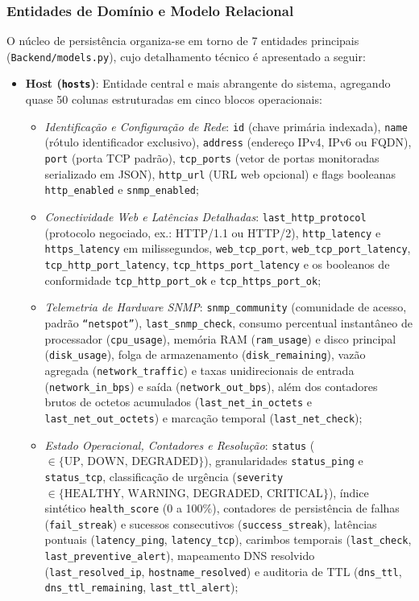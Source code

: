\documentclass[12pt,a4paper]{article}
\begin{document}
\subsubsection{Entidades de Domínio e Modelo Relacional}
O núcleo de persistência organiza-se em torno de 7 entidades principais (\texttt{Backend/models.py}), cujo detalhamento técnico é apresentado a seguir:

\begin{itemize}[leftmargin=1.25cm]
\item \textbf{Host (\texttt{hosts})}: Entidade central e mais abrangente do sistema, agregando quase 50 colunas estruturadas em cinco blocos operacionais:
  \begin{itemize}
  \item \textit{Identificação e Configuração de Rede}: \texttt{id} (chave primária indexada), \texttt{name} (rótulo identificador exclusivo), \texttt{address} (endereço IPv4, IPv6 ou FQDN), \texttt{port} (porta TCP padrão), \texttt{tcp\_ports} (vetor de portas monitoradas serializado em JSON), \texttt{http\_url} (URL web opcional) e flags booleanas \texttt{http\_enabled} e \texttt{snmp\_enabled};
  \item \textit{Conectividade Web e Latências Detalhadas}: \texttt{last\_http\_protocol} (protocolo negociado, ex.: HTTP/1.1 ou HTTP/2), \texttt{http\_latency} e \texttt{https\_latency} em milissegundos, \texttt{web\_tcp\_port}, \texttt{web\_tcp\_port\_latency}, \texttt{tcp\_http\_port\_latency}, \texttt{tcp\_https\_port\_latency} e os booleanos de conformidade \texttt{tcp\_http\_port\_ok} e \texttt{tcp\_https\_port\_ok};
  \item \textit{Telemetria de Hardware SNMP}: \texttt{snmp\_community} (comunidade de acesso, padrão \texttt{``netspot''}), \texttt{last\_snmp\_check}, consumo percentual instantâneo de processador (\texttt{cpu\_usage}), memória RAM (\texttt{ram\_usage}) e disco principal (\texttt{disk\_usage}), folga de armazenamento (\texttt{disk\_remaining}), vazão agregada (\texttt{network\_traffic}) e taxas unidirecionais de entrada (\texttt{network\_in\_bps}) e saída (\texttt{network\_out\_bps}), além dos contadores brutos de octetos acumulados (\texttt{last\_net\_in\_octets} e \texttt{last\_net\_out\_octets}) e marcação temporal (\texttt{last\_net\_check});
  \item \textit{Estado Operacional, Contadores e Resolução}: \texttt{status} ($\in \{\text{UP, DOWN, DEGRADED}\}$), granularidades \texttt{status\_ping} e \texttt{status\_tcp}, classificação de urgência (\texttt{severity} $\in \{\text{HEALTHY, WARNING, DEGRADED, CRITICAL}\}$), índice sintético \texttt{health\_score} (0 a 100\%), contadores de persistência de falhas (\texttt{fail\_streak}) e sucessos consecutivos (\texttt{success\_streak}), latências pontuais (\texttt{latency\_ping}, \texttt{latency\_tcp}), carimbos temporais (\texttt{last\_check}, \texttt{last\_preventive\_alert}), mapeamento DNS resolvido (\texttt{last\_resolved\_ip}, \texttt{hostname\_resolved}) e auditoria de TTL (\texttt{dns\_ttl}, \texttt{dns\_ttl\_remaining}, \texttt{last\_ttl\_alert});

\end{itemize}
\end{itemize}
\end{document}
